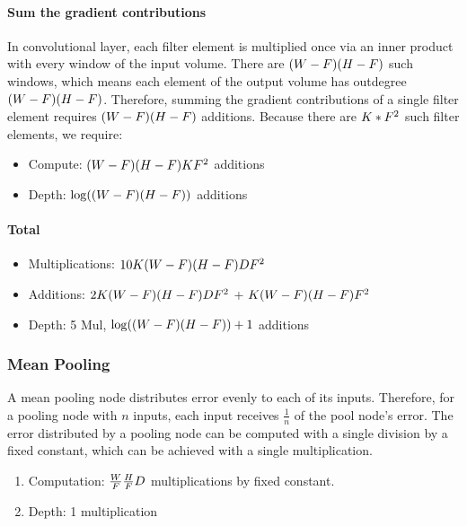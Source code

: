 \paragraph{Sum the gradient contributions}
In convolutional layer,
each filter element is multiplied once via an inner product with every window of the input volume. There are $(W-F)(H-F)$ such windows, which means each element of the output volume has outdegree $(W-F)(H-F)$. Therefore, summing the gradient contributions of a single filter element requires $(W-F)(H-F)$ additions. 
Because there are $K * F^{2}$ such filter elements, we require:
\begin{itemize}
	\item Compute: $(W-F)(H-F) K F^{2}$ additions
	\item Depth: $\log((W-F)(H-F))$ additions
\end{itemize}


\paragraph{Total}
\begin{itemize}
	\item Multiplications: $10K(W-F)(H-F)DF^{2}$  

	\item Additions:
	$2K(W-F)(H-F)DF^{2}$ +
	$K (W-F)(H-F) F^{2}$ 

	\item 
	Depth: 5 Mul,  $\log((W-F)(H-F))+1$ additions

\end{itemize}


\subsubsection{Mean Pooling}
A mean pooling node distributes error evenly to each of its inputs. Therefore, for a pooling node with $n$ inputs, each input receives $\frac{1}{n}$ of the pool node's error. The error distributed by a pooling node can be computed with a single division by a fixed constant, which can be achieved with a single multiplication.

\begin{enumerate}
	\item Computation: $\frac{W}{F}\frac{H}{F}D $ multiplications by fixed constant.
	\item Depth: 1 multiplication
\end{enumerate}


